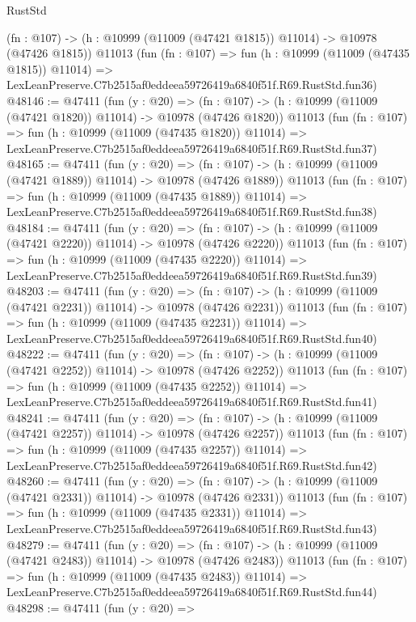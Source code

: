 \begin{lexlean}{RustStd}
\begin{coremodule}
    (fn : @107) -> (h : @10999 (@11009 (@47421 @1815)) @11014) -> @10978 (@47426 @1815))
    @11013
    (fun (fn : @107) =>
    fun (h : @10999 (@11009 (@47435 @1815)) @11014) =>
    LexLeanPreserve.C7b2515af0eddeea59726419a6840f51f.R69.RustStd.fun36)
@48146 := @47411
    (fun (y : @20) =>
    (fn : @107) -> (h : @10999 (@11009 (@47421 @1820)) @11014) -> @10978 (@47426 @1820))
    @11013
    (fun (fn : @107) =>
    fun (h : @10999 (@11009 (@47435 @1820)) @11014) =>
    LexLeanPreserve.C7b2515af0eddeea59726419a6840f51f.R69.RustStd.fun37)
@48165 := @47411
    (fun (y : @20) =>
    (fn : @107) -> (h : @10999 (@11009 (@47421 @1889)) @11014) -> @10978 (@47426 @1889))
    @11013
    (fun (fn : @107) =>
    fun (h : @10999 (@11009 (@47435 @1889)) @11014) =>
    LexLeanPreserve.C7b2515af0eddeea59726419a6840f51f.R69.RustStd.fun38)
@48184 := @47411
    (fun (y : @20) =>
    (fn : @107) -> (h : @10999 (@11009 (@47421 @2220)) @11014) -> @10978 (@47426 @2220))
    @11013
    (fun (fn : @107) =>
    fun (h : @10999 (@11009 (@47435 @2220)) @11014) =>
    LexLeanPreserve.C7b2515af0eddeea59726419a6840f51f.R69.RustStd.fun39)
@48203 := @47411
    (fun (y : @20) =>
    (fn : @107) -> (h : @10999 (@11009 (@47421 @2231)) @11014) -> @10978 (@47426 @2231))
    @11013
    (fun (fn : @107) =>
    fun (h : @10999 (@11009 (@47435 @2231)) @11014) =>
    LexLeanPreserve.C7b2515af0eddeea59726419a6840f51f.R69.RustStd.fun40)
@48222 := @47411
    (fun (y : @20) =>
    (fn : @107) -> (h : @10999 (@11009 (@47421 @2252)) @11014) -> @10978 (@47426 @2252))
    @11013
    (fun (fn : @107) =>
    fun (h : @10999 (@11009 (@47435 @2252)) @11014) =>
    LexLeanPreserve.C7b2515af0eddeea59726419a6840f51f.R69.RustStd.fun41)
@48241 := @47411
    (fun (y : @20) =>
    (fn : @107) -> (h : @10999 (@11009 (@47421 @2257)) @11014) -> @10978 (@47426 @2257))
    @11013
    (fun (fn : @107) =>
    fun (h : @10999 (@11009 (@47435 @2257)) @11014) =>
    LexLeanPreserve.C7b2515af0eddeea59726419a6840f51f.R69.RustStd.fun42)
@48260 := @47411
    (fun (y : @20) =>
    (fn : @107) -> (h : @10999 (@11009 (@47421 @2331)) @11014) -> @10978 (@47426 @2331))
    @11013
    (fun (fn : @107) =>
    fun (h : @10999 (@11009 (@47435 @2331)) @11014) =>
    LexLeanPreserve.C7b2515af0eddeea59726419a6840f51f.R69.RustStd.fun43)
@48279 := @47411
    (fun (y : @20) =>
    (fn : @107) -> (h : @10999 (@11009 (@47421 @2483)) @11014) -> @10978 (@47426 @2483))
    @11013
    (fun (fn : @107) =>
    fun (h : @10999 (@11009 (@47435 @2483)) @11014) =>
    LexLeanPreserve.C7b2515af0eddeea59726419a6840f51f.R69.RustStd.fun44)
@48298 := @47411
    (fun (y : @20) =>

\end{coremodule}
\end{lexlean}
